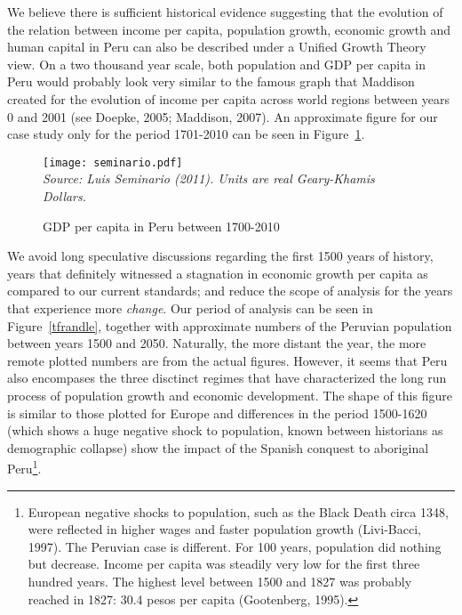 \documentclass[12pt]{article}%
\begin{document}
We believe there is sufficient historical evidence suggesting that the evolution of the relation between income per capita, population growth, economic growth and human capital in Peru can also be described under a Unified Growth Theory view. On a two thousand year scale, both population and GDP per capita in Peru would probably look very similar to the famous graph that Maddison created for the evolution of income  per capita across world regions between years 0 and 2001 (see Doepke, 2005; Maddison, 2007). An approximate figure for our case study only for the period 1701-2010 can be seen in Figure~\ref{longgdp}.
\begin{figure}[h]
\caption{GDP per capita in Peru between 1700-2010}
\centering
\texttt{[image: seminario.pdf]} \\
\footnotesize
\textit{Source: Luis Seminario (2011). Units are real Geary-Khamis Dollars.}
\label{longgdp}
\end{figure}
We avoid long speculative discussions regarding the first 1500 years of history, years that definitely witnessed a stagnation in economic growth per capita as compared to our current standards; and reduce the scope of analysis for the years that experience more \emph{change}. Our period of analysis can be seen in Figure~\ref{tfrandle}, together with approximate numbers of the Peruvian population between years 1500 and 2050. Naturally, the more distant the year, the more remote plotted numbers are from the actual figures. However, it seems that Peru also encompases the three disctinct regimes that have characterized the long run process of population growth and economic development. The shape of this figure is similar to those plotted for Europe and differences in the period 1500-1620 (which shows a huge negative shock to population, known between historians as demographic collapse) show the impact of the Spanish conquest to aboriginal Peru\footnote{European negative shocks to population, such as the Black Death circa 1348, were reflected in higher wages and faster population growth (Livi-Bacci, 1997). The Peruvian case is different. For 100 years, population did nothing but decrease. Income per capita was steadily very low for the first three hundred years. The highest level between 1500 and 1827 was probably reached in 1827: 30.4 pesos per capita (Gootenberg, 1995).}.
\end{document}
